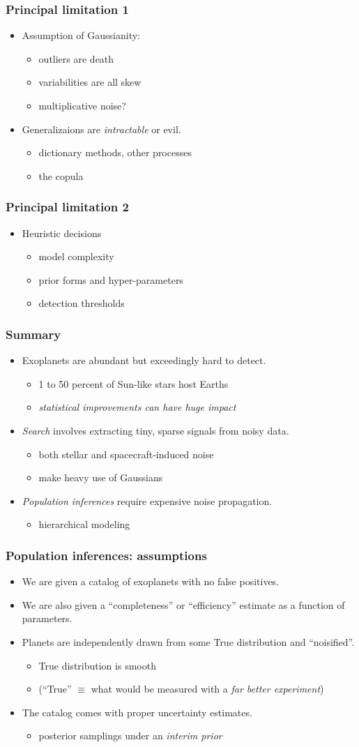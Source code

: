 \documentclass[pdftex]{beamer}
\newcommand{\conclusions}{%
\begin{frame}
  \frametitle{Summary}
  \begin{itemize}
  \item Exoplanets are abundant but exceedingly hard to detect.
    \begin{itemize}
    \item 1 to 50 percent of Sun-like stars host Earths
    \item \emph{statistical improvements can have huge impact}
    \end{itemize}
  \item \emph{Search} involves extracting tiny, sparse signals from noisy data.
    \begin{itemize}
    \item both stellar and spacecraft-induced noise
    \item make heavy use of Gaussians
    \end{itemize}
  \item \emph{Population inferences} require expensive noise propagation.
    \begin{itemize}
    \item hierarchical modeling
    \end{itemize}
  \end{itemize}
\end{frame}}
\begin{document}
\begin{frame}
  \frametitle{Principal limitation 1}
  \begin{itemize}
  \item Assumption of Gaussianity:
    \begin{itemize}
    \item outliers are death
    \item variabilities are all skew
    \item multiplicative noise?
    \end{itemize}
  \item Generalizaions are \emph{intractable} or evil.
    \begin{itemize}
    \item dictionary methods, other processes
    \item the copula
    \end{itemize}
  \end{itemize}
\end{frame}

\begin{frame}
  \frametitle{Principal limitation 2}
  \begin{itemize}
  \item Heuristic decisions
    \begin{itemize}
    \item model complexity
    \item prior forms and hyper-parameters
    \item detection thresholds
    \end{itemize}
  \end{itemize}
\end{frame}

\conclusions

\begin{frame}
  \frametitle{Population inferences: assumptions}
  \begin{itemize}
  \item We are given a catalog of exoplanets with no false positives.
  \item We are also given a ``completeness'' or ``efficiency'' estimate as a function of parameters.
  \item Planets are independently drawn from some True distribution and ``noisified''.
    \begin{itemize}
    \item True distribution is smooth
    \item (``True'' $\equiv$ what would be measured with a \emph{far better experiment})
    \end{itemize}
  \item The catalog comes with proper uncertainty estimates.
    \begin{itemize}
    \item posterior samplings under an \emph{interim prior}
    \end{itemize}
  \end{itemize}
\end{frame}
\end{document}
